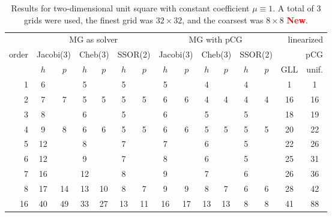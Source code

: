 \documentclass[smallcondensed,final]{svjour3}     %
\newcommand{\todo}[1]{\textcolor{red}{\bf #1}}
\begin{document}
\begin{table}
  \caption{\label{tab:box} Results for two-dimensional unit square
    with constant coefficient $\mu\equiv 1$.  A total of 3 grids were
    used, the finest grid was $32\times 32$, and the coarsest was
    $8\times 8$ \todo{New}.}
  \centering
  \begin{tabular}{|r|c c|c c|c c||c c|c c|c c||c c|} 
    \hline
    & \multicolumn{6}{c||}{MG as solver} & \multicolumn{6}{c||}{MG with pCG} & \multicolumn{2}{r|}{linearized} \\
    \cline{2-13}
    \!\!\! order \!\!\!\! &  \multicolumn{2}{c|}{\!\scriptsize  Jacobi(3)\!} &  \multicolumn{2}{c|}{\!\scriptsize Cheb(3)\!} & \multicolumn{2}{c||}{\!\scriptsize  SSOR(2)\!} & \multicolumn{2}{c|}{\!\scriptsize Jacobi(3)\!} &  \multicolumn{2}{c|}{\!\scriptsize Cheb(3)\!} & \multicolumn{2}{c||}{\!\scriptsize SSOR(2)\!} & \multicolumn{2}{r|}{pCG}\\
\hline
 & $h$ & $p$ & $h$ & $p$& $h$ & $p$& $h$ & $p$& $h$ & $p$& $h$ & $p$& GLL & unif.\\
 \cline{2-15}
1 & 6 & & 5 & & 5 & & 5 & & 4 & & 4 & & 1 & 1  \\
2 & 7 & 7 & 5 & 5 & 5 & 5 & 6 & 6 & 4 & 4 & 4 & 4 & 16 & 16 \\
3 & 8 & & 6 & & 5 & & 6 & & 5 & & 5 & & 18 & 19  \\
4 & 9 & 8 & 6 & 6 & 5 & 5 & 6 & 6 & 5 & 5 & 5 & 5 & 20 & 22 \\
5 & 12 & & 8 & & 7 & & 7 & & 6 & & 5 & & 22 & 26  \\
6 & 12 & & 9 & & 7 & & 8 & & 6 & & 5 & & 25 & 31  \\
7 & 16 & & 12 & & 8 & & 9 & & 7 & & 6 & & 26 & 36  \\
8 & 17 & 14 & 13 & 10 & 8 & 7 & 9 & 9 & 8 & 7 & 6 & 6 & 28 & 42 \\
16 & 40 & 49 & 33 & 27 & 13 & 11 & 16 & 17 & 13 & 13 & 8 & 8 & 41 & 88\\
\hline
  \end{tabular}
\end{table}
\end{document}
